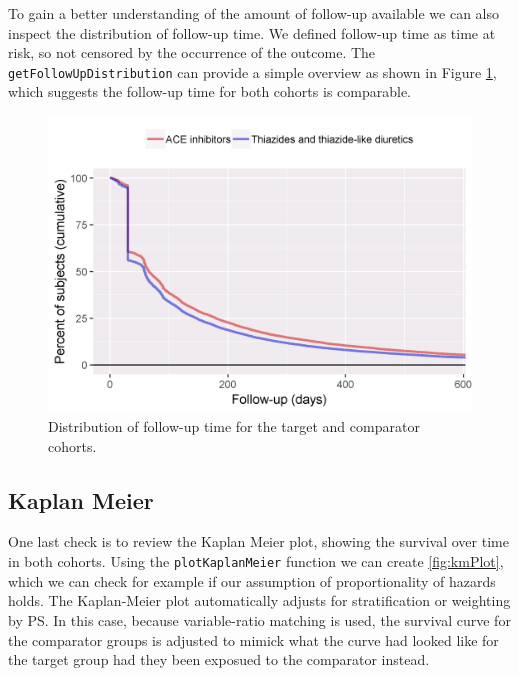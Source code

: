 \documentclass[11pt]{book}
\theoremstyle{definition}
\theoremstyle{definition}
\theoremstyle{definition}
\theoremstyle{remark}
\begin{document}
To gain a better understanding of the amount of follow-up available we can also inspect the distribution of follow-up time. We defined follow-up time as time at risk, so not censored by the occurrence of the outcome. The \texttt{getFollowUpDistribution} can provide a simple overview as shown in Figure \ref{fig:followUp}, which suggests the follow-up time for both cohorts is comparable.

\begin{figure}

{\centering \includegraphics[width=0.8\linewidth]{images/PopulationLevelEstimation/followUp} 

}

\caption{Distribution of follow-up time for the target and comparator cohorts.}\label{fig:followUp}
\end{figure}

\hypertarget{kaplan-meier}{%
\subsection{Kaplan Meier}\label{kaplan-meier}}

One last check is to review the Kaplan Meier plot, showing the survival over time in both cohorts. Using the \texttt{plotKaplanMeier} function we can create \ref{fig:kmPlot}, which we can check for example if our assumption of proportionality of hazards holds. The Kaplan-Meier plot automatically adjusts for stratification or weighting by PS. In this case, because variable-ratio matching is used, the survival curve for the comparator groups is adjusted to mimick what the curve had looked like for the target group had they been exposued to the comparator instead.
\end{document}
